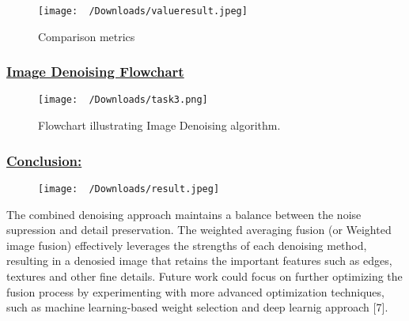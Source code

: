 \documentclass[
  11pt,
]{article}
\begin{document}
\begin{figure}[H]
\centering
\texttt{[image: ~/Downloads/valueresult.jpeg]}
\caption{Comparison metrics}
\end{figure}

\subsubsection*{\underline{Image Denoising Flowchart }}
\begin{figure}[H]
\centering
\texttt{[image: ~/Downloads/task3.png]}
\caption{Flowchart illustrating Image Denoising algorithm.}
\end{figure}

\subsubsection*{\underline{Conclusion:}}
\begin{figure}[H]
\centering
\texttt{[image: ~/Downloads/result.jpeg]}
\end{figure}

The combined denoising approach maintains a balance between the noise
supression and detail preservation. The weighted averaging fusion (or
Weighted image fusion) effectively leverages the strengths of each
denoising method, resulting in a denosied image that retains the
important features such as edges, textures and other fine details.
Future work could focus on further optimizing the fusion process by
experimenting with more advanced optimization techniques, such as
machine learning-based weight selection and deep learnig approach
{[}7{]}.
\end{document}
